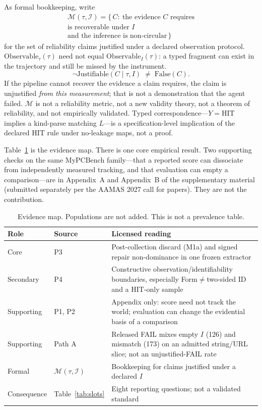 \documentclass[sigconf,anonymous]{aamas}
\newcommand{\Just}{\mathrm{Justifiable}}
\begin{document}
As formal bookkeeping, write
\begin{multline}
\mathcal{M}(\tau,\mathcal{I})
=\{\,C:\ \text{the evidence $C$ requires}\\
\text{is recoverable under $I$}\\
\text{and the inference is non-circular}\,\}
\label{eq:M}
\end{multline}
for the set of reliability claims justified under a declared observation protocol.
$\mathrm{Observable}_{\tau}(\tau)$ need not equal $\mathrm{Observable}_{I}(\tau)$: a typed fragment can exist in the trajectory and still be missed by the instrument.
\[
\neg \Just(C\mid \tau,I) \;\neq\; \mathrm{False}(C).
\]
If the pipeline cannot recover the evidence a claim requires, the claim is unjustified \emph{from this measurement}; that is not a demonstration that the agent failed.
$\mathcal{M}$ is not a reliability metric, not a new validity theory, not a theorem of reliability, and not empirically validated.
Typed correspondence---$Y=\mathrm{HIT}$ implies a kind-parse matching $L$---is a specification-level implication of the declared HIT rule under no-leakage maps, not a proof.

Table~\ref{tab:map} is the evidence map.
There is one core empirical result.
Two supporting checks on the same MyPCBench family---that a reported score can dissociate from independently measured tracking, and that evaluation can empty a comparison---are in Appendix~A and Appendix~B of the supplementary material (submitted separately per the AAMAS 2027 call for papers).
They are not the contribution.

\begin{table}[H]
\centering
\caption{Evidence map. Populations are not added. This is not a prevalence table.}
\label{tab:map}
\small
\begin{tabular}{@{}llp{}@{}}
\toprule
Role & Source & Licensed reading \\
\midrule
Core & P3 & Post-collection discard (M1a) and signed repair non-dominance in one frozen extractor \\
Secondary & P4 & Constructive observation/identifiability boundaries, especially Form$\neq$two-sided ID and a HIT-only sample \\
Supporting & P1, P2 & Appendix only: score need not track the world; evaluation can change the evidential basis of a comparison \\
Supporting & Path A & Released FAIL mixes empty $I$ (126) and mismatch (173) on an admitted string/URL slice; not an unjustified-FAIL rate \\
Formal & $\mathcal{M}(\tau,\mathcal{I})$ & Bookkeeping for claims justified under a declared $I$ \\
Consequence & Table~\ref{tab:slots} & Eight reporting questions; not a validated standard \\
\bottomrule
\end{tabular}
\end{table}
\end{document}
